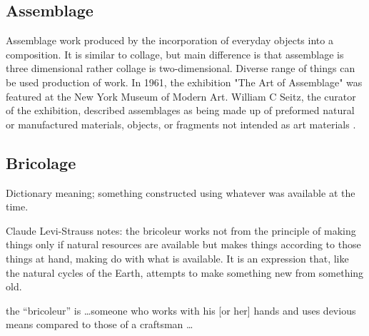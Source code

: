 
\cite{greenberg1984collage}

\subsection{Assemblage}
Assemblage work produced by the incorporation of everyday objects into a composition. It is similar to collage, but main difference is that assemblage is three dimensional rather collage is two-dimensional. Diverse range of things can be used production of work. In 1961, the exhibition "The Art of Assemblage" was featured at the New York Museum of Modern Art. William C Seitz, the curator of the exhibition, described assemblages as being made up of preformed natural or manufactured materials, objects, or fragments not intended as art materials \cite{seitz1961art}.

\subsection{Bricolage}
Dictionary meaning; something constructed using whatever was available at the time.



Claude Levi-Strauss notes: the bricoleur works not from the principle of making things only if natural resources are available but makes things according to those things at hand, making do with what is available. It is an expression that, like the natural cycles of the Earth, attempts to make something new from something old. \cite{levi1966savage}

the “bricoleur” is \ldots someone who works with his [or her] hands and uses devious means compared to those of a craftsman \ldots \cite{levi1966savage}

